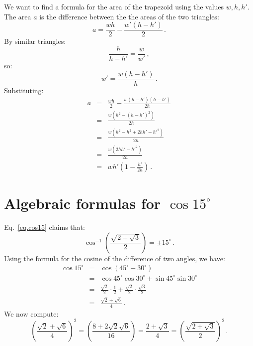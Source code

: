 We want to find a formula for the area of the trapezoid using the values $w, h, h'$. The area $a$ is the difference between the the areas of the two triangles:
\begin{displaymath}
a = \frac{wh}{2} - \frac{w'(h-h')}{2}\,.
\end{displaymath}
By similar triangles:
\begin{displaymath}
\frac{h}{h-h'} = \frac{w}{w'}\,,
\end{displaymath}
so:
\begin{displaymath}
w' = \frac{w(h-h')}{h}\,.
\end{displaymath}
Substituting:
\begin{eqnarray*}
a &=& \frac{wh}{2} - \frac{w(h-h')(h-h')}{2h}\\[8pt]
&=&\frac{w(h^2-(h-h')^2)}{2h}\\[8pt]
&=&\frac{w(h^2-h^2+2hh'-h'^2)}{2h}\\[8pt]
&=&\frac{w(2hh'-h'^2)}{2h}\\[8pt]
&=&wh'(1-\frac{h'}{2h})\,.
\end{eqnarray*}

\section{Algebraic formulas for $\cos 15^{\circ}$}\label{a.cosine}

Eq.~\ref{eq.cos15} claims that:
\[
\cos^{-1}\left(\frac{\sqrt{2+\sqrt{3}}}{2}\right) = \pm 15^{\circ}\,.
\]
Using the formula for the cosine of the difference of two angles, we have:
\begin{eqnarray*}
\cos 15^\circ &=& \cos(45^\circ-30^\circ)\\
&=& \cos 45^\circ \cos 30^\circ + \sin 45^\circ \sin 30^\circ\\
&=&\frac{\sqrt{2}}{2}\cdot \frac{1}{2} + \frac{\sqrt{2}}{2}\cdot \frac{\sqrt{3}}{2}\\
&=&\frac{\sqrt{2}+\sqrt{6}}{4}\,.
\end{eqnarray*}
We now compute:
\[
\left(\frac{\sqrt{2}+\sqrt{6}}{4}\right)^2 =
\left(\frac{8+2\sqrt{2}\sqrt{6}}{16}\right)=\frac{2+\sqrt{3}}{4}=
\left(\frac{\sqrt{2+\sqrt{3}}}{2}\right)^2\,.
\]
